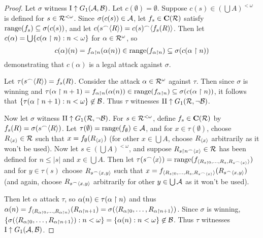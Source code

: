 \documentclass{amsart}
\theoremstyle{plain}
\theoremstyle{definition}
\theoremstyle{remark}
\theoremstyle{plain}
\theoremstyle{definition}
\theoremstyle{remark}
\begin{document}
\begin{proof}
  Let \(\sigma\) witness 
  \(\mathrm{I}\uparrow G_{1}(\mathcal{A},\mathcal{B})\).
  Let \(c(\emptyset)=\emptyset\). Suppose 
  \(c(s)\in(\bigcup A)^{<\omega}\)
  is defined for \(s\in\mathcal{R}^{<\omega}\). Since \(\sigma(c(s))\in\mathcal{A}\),
  let \(f_s\in\mathbf C(\mathcal{R})\) satisfy \(\text{range}(f_s)\subseteq\sigma(c(s))\),
  and let \(c(s{^\frown}\langle R\rangle)=c(s){^\frown}\langle f_s(R)\rangle\).
  Then let \(c(\alpha)=\bigcup\{c(\alpha\restriction n):n<\omega\}\)
  for \(\alpha\in\mathcal{R}^\omega\), so
  \[
    c(\alpha)(n)
      =
    f_{\alpha\restriction n}(\alpha(n))
      \in
    \text{range}(f_{\alpha\restriction n})
      \subseteq
    \sigma(c(\alpha\restriction n))
  \]
  demonstrating that \(c(\alpha)\) is a legal attack against \(\sigma\).

  Let \(\tau(s{^\frown}\langle R\rangle)=f_s(R)\). Consider the attack \(\alpha\in\mathcal{R}^\omega\)
  against \(\tau\). Then since \(\sigma\) is winning and
  \(
    \tau(\alpha\restriction n+1)=f_{\alpha\restriction n}(\alpha(n))\in
    \text{range}(f_{\alpha\restriction n})\subseteq\sigma(c(\alpha\restriction n))
  \), it follows that \(\{\tau(\alpha\restriction n+1):n<\omega\}\not\in\mathcal{B}\).
  Thus \(\tau\) witnesses
  \(\mathrm{II}\uparrow G_{1}(\mathcal{R},\neg\mathcal{B})\).

  Now let \(\sigma\) witness
  \(\mathrm{II}\uparrow G_{1}(\mathcal{R},\neg\mathcal{B})\).
  For \(s\in \mathcal{R}^{<\omega}\), define \(f_s\in\mathbf C(\mathcal{R})\)
  by \(f_s(R)=\sigma(s{^\frown}\langle R\rangle)\). Let \(\tau(\emptyset)=\text{range}(f_\emptyset)\in\mathcal{A}\),
  and for \(x\in\tau(\emptyset)\), choose \(R_{\langle x\rangle}\in\mathcal{R}\) such that
  \(x=f_{\emptyset}(R_{\langle x\rangle})\) (for other \(x\in\bigcup A\), choose \(R_{\langle x\rangle}\)
  arbitrarily as it won't be used). Now let \(s\in(\bigcup A)^{<\omega}\),
  and suppose \(R_{s\restriction n{^\frown}\langle x\rangle}\in\mathcal{R}\) has been defined for
  \(n\leq|s|\) and \(x\in\bigcup A\). 
  Then let \(\tau(s{^\frown}\langle x\rangle)=\text{range}(f_{\langle R_{s\restriction 0},\dots,R_s,R_{s{^\frown}\langle x\rangle}\rangle})\)
  and for \(y\in\tau(s)\) choose \(R_{s{^\frown}\langle x,y\rangle}\) such that
  \(x=f_{\langle R_{s\restriction 0},\dots,R_s,R_{s{^\frown}\langle x\rangle}\rangle}(R_{s{^\frown}\langle x,y\rangle})\) (and again,
  choose \(R_{s{^\frown}\langle x,y\rangle}\) arbitrarily for other \(y\in\bigcup\mathcal{A}\) as it won't be used).

  Then let \(\alpha\) attack \(\tau\), so
  \(\alpha(n)\in\tau(\alpha\restriction n)\) and thus 
  \(\alpha(n)=f_{\langle R_{\alpha\restriction 0},\dots,R_{\alpha\restriction n}\rangle}(R_{\alpha\restriction n+1})
  =\sigma(\langle R_{\alpha\restriction 0},\dots,R_{\alpha\restriction n+1}\rangle)\).  Since \(\sigma\) is winning,
  \(\{\sigma(\langle R_{\alpha\restriction 0},\dots,R_{\alpha\restriction n+1}\rangle):n<\omega\}
  =\{\alpha(n):n<\omega\}\not\in\mathcal{B}\).
  Thus \(\tau\) witnesses
  \(\mathrm{I}\uparrow G_{1}(\mathcal{A},\mathcal{B})\).
\end{proof}
\end{document}
